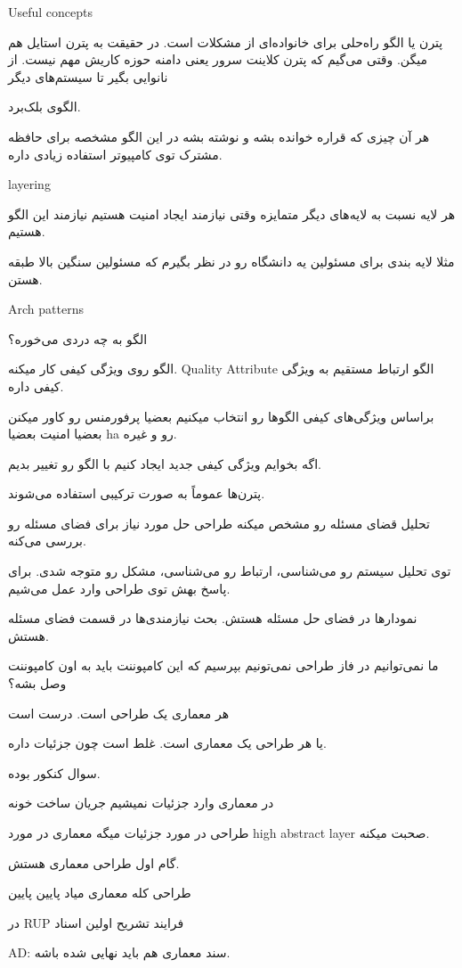 Useful concepts

پترن یا الگو راه‌حلی برای خانواده‌ای از مشکلات است.  در حقیقت به پترن استایل هم
میگن. وقتی می‌گیم که پترن کلاینت سرور یعنی دامنه حوزه کاریش مهم نیست. از نانوایی
بگیر تا سیستم‌های دیگر

الگوی بلک‌برد.

هر آن چیزی که قراره خوانده بشه و نوشته بشه در این الگو مشخصه برای حافظه مشترک
توی کامپیوتر استفاده زیادی داره.

layering

هر لایه نسبت به لایه‌های دیگر متمایزه وقتی نیازمند ایجاد امنیت هستیم نیازمند این
الگو هستیم.

مثلا لایه بندی برای مسئولین یه دانشگاه رو در نظر بگیرم که مسئولین سنگین بالا
طبقه هستن.

Arch patterns

الگو به چه دردی می‌خوره؟

الگو روی ویژگی کیفی کار میکنه. Quality Attribute 
الگو ارتباط مستقیم به ویژگی کیفی داره.

براساس ویژگی‌های کیفی الگوها رو انتخاب میکنیم بعضیا پرفورمنس رو کاور میکنن بعضیا
امنیت بعضیا ha رو و غیره.

اگه بخوایم ویژگی کیفی جدید ایجاد کنیم با الگو رو تغییر بدیم.

پترن‌ها عموماً به صورت ترکیبی استفاده می‌شوند.

تحلیل قضای مسئله رو مشخص میکنه
طراحی حل مورد نیاز برای فضای مسئله رو بررسی می‌کنه.

توی تحلیل سیستم رو می‌شناسی، ارتباط رو می‌شناسی، مشکل رو متوجه شدی.
برای پاسخ بهش توی طراحی وارد عمل می‌شیم.

نمودار‌ها در فضای حل مسئله هستش.
بحث نیازمندی‌ها در قسمت فضای مسئله هستش.

ما نمی‌توانیم در فاز طراحی نمی‌تونیم بپرسیم که این کامپوننت باید به اون کامپوننت
وصل بشه؟

هر معماری یک طراحی است. درست است

یا هر طراحی یک معماری است. غلط است چون جزئیات داره.

سوال کنکور بوده.

در معماری وارد جزئیات نمیشیم جریان ساخت خونه 

طراحی در مورد جزئیات میگه
معماری در مورد high abstract layer صحبت میکنه.

گام اول طراحی معماری هستش.

طراحی کله معماری میاد پایین پایین

در RUP فرایند تشریح اولین اسناد

AD: سند معماری هم باید نهایی شده باشه.

